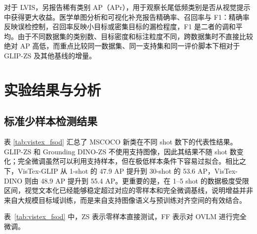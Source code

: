 对于 LVIS，另报告稀有类别 AP（APr），用于观察长尾低频类别是否从视觉提示中获得更大收益\cite{gupta2019lvis}。医学单图分析和可视化补充报告精确率、召回率与 F1：精确率反映误检控制，召回率反映小目标或密集目标的漏检程度，F1 是二者的调和平均。由于不同数据集的类别数、目标密度和标注粒度不同，跨数据集时不直接比较绝对 AP 高低，而重点比较同一数据集、同一支持集和同一评价脚本下相对于 GLIP-ZS 及其他基线的增量。

\section{实验结果与分析}
\subsection{标准少样本检测结果}
表 \ref{tab:vistex_fsod} 汇总了 MSCOCO 新类在不同 shot 数下的代表性结果。GLIP-ZS 和 Grounding DINO-ZS 不使用支持图像，因此其结果不随 shot 数变化；完全微调虽然可以利用支持样本，但在极低样本条件下容易过拟合。相比之下，VisTex-GLIP 从 1-shot 的 47.9 AP 提升到 30-shot 的 53.6 AP，VisTex-DINO 则由 48.9 AP 提升到 55.4 AP。更重要的是，在 1--5 shot 的数据极度受限区间，视觉文本化已经能够稳定超过对应的零样本和完全微调基线，说明增益并非来自大规模目标域训练，而是来自支持图像语义与预训练对齐空间的有效结合。

\begin{table}[t]
  \centering
  \caption{MSCOCO 新类少样本检测结果}
  \label{tab:vistex_fsod}
\end{table}
表~\ref{tab:vistex_fsod} 中，ZS 表示零样本直接测试，FF 表示对 OVLM 进行完全微调。


